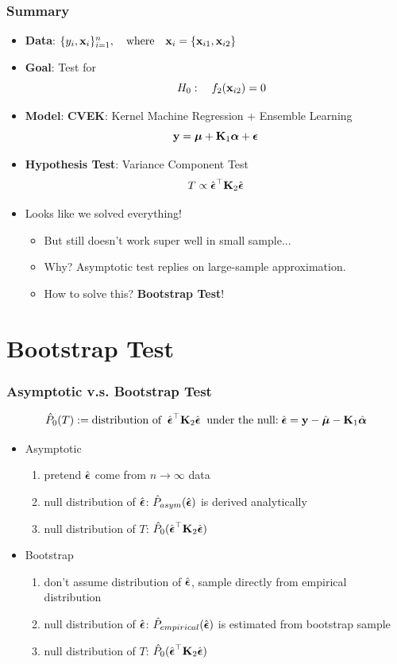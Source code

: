 \documentclass{beamer}
\begin{document}
\begin{frame}
\frametitle{Summary}
\begin{itemize}
\item \textbf{Data}: 
$\{ y_i, {\bf x}_i \}_{i=1}^n, \quad \mbox{where} \quad 
{\bf x}_i= \{{\bf x}_{i1}, {\bf x}_{i2}\}$
\item \textbf{Goal}: Test for $$\quad H_0: \quad f_2({\bf x}_{i2}) = 0$$
\item \textbf{Model}: {\color{red}\textbf{CVEK}}: Kernel Machine Regression + Ensemble Learning
$${\bf y} =\boldsymbol{\mu} + {\bf K}_1\boldsymbol{\alpha} +\boldsymbol{\epsilon}$$
\item \textbf{Hypothesis Test}: Variance Component Test
$$ T \propto \hat{\boldsymbol{\epsilon}}^\top {\bf K}_2 \hat{\boldsymbol{\epsilon}}$$
\item Looks like we solved everything! 
\begin{itemize}[<+->]
\item But still doesn't work super well in small sample...
\item Why? Asymptotic test replies on large-sample approximation.
\item How to solve this? {\color{red} \textbf{Bootstrap Test}!}
\end{itemize}
\end{itemize}
\end{frame}

\section{Bootstrap Test} 
\begin{frame}
\frametitle{Asymptotic v.s. Bootstrap Test}
\[\hat{P}_0(T):= \mbox{distribution of}\; \; \hat{\boldsymbol{\epsilon}}^\top {\bf K}_2 \hat{\boldsymbol{\epsilon}}\; \;  \mbox{under the null:}\; \hat{\boldsymbol{\epsilon}}={\bf y}-\hat{\boldsymbol{\mu}} - {\bf K}_1 \hat{\boldsymbol{\alpha}}\]
\begin{itemize}
\item Asymptotic
\begin{enumerate}
\item pretend $\hat{\boldsymbol{\epsilon}}$ come from $n \to \infty$ data
\item null distribution of $\hat{\boldsymbol{\epsilon}}$: $\hat{P}_{asym}(\hat{\boldsymbol{\epsilon}})$ is derived analytically
\item null distribution of $T$: $\hat{P}_{0}(\hat{\boldsymbol{\epsilon}}^\top {\bf K}_2 \hat{\boldsymbol{\epsilon}})$
\end{enumerate}
\item Bootstrap
\begin{enumerate}
\item don't assume distribution of $\hat{\boldsymbol{\epsilon}}$, sample directly from empirical distribution
\item null distribution of $\hat{\boldsymbol{\epsilon}}$: $\hat{P}_{empirical}(\hat{\boldsymbol{\epsilon}})$ is estimated from bootstrap sample
\item null distribution of $T$: $\hat{P}_{0}(\hat{\boldsymbol{\epsilon}}^\top {\bf K}_2 \hat{\boldsymbol{\epsilon}})$
\end{enumerate}
\end{itemize}
\end{frame}
\end{document}
